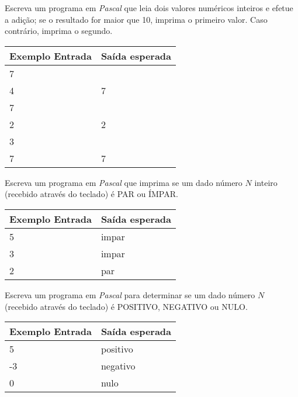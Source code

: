 \item Escreva um programa em \emph{Pascal} que leia dois valores numéricos 
inteiros e efetue a adição; se o resultado for maior que 10, imprima o 
primeiro valor. Caso contrário, imprima o segundo.

\begin{center}
\begin{tabular}{|l|l|} \hline
Exemplo Entrada & Saída esperada \\ \hline
7                &                \\
4                &   7             \\ \hline
7                &                \\
2                &   2             \\ \hline
3                &                \\
7                &   7             \\ \hline
\end{tabular}
\end{center}

\item Escreva um programa em \emph{Pascal} que imprima se um dado número $N$ 
inteiro (recebido através do teclado) é PAR ou ÍMPAR.

\begin{center}
\begin{tabular}{|l|l|} \hline
Exemplo Entrada & Saída esperada \\ \hline
5                & impar               \\ \hline
3                & impar               \\ \hline
2                & par               \\ \hline
\end{tabular}
\end{center}

\item Escreva um programa em \emph{Pascal} para determinar se um dado número 
$N$ (recebido através do teclado) é POSITIVO, NEGATIVO ou NULO.

\begin{center}
\begin{tabular}{|l|l|} \hline
Exemplo Entrada & Saída esperada \\ \hline
5               & positivo               \\ \hline
-3              & negativo               \\ \hline
0               & nulo               \\ \hline
\end{tabular}
\end{center}

